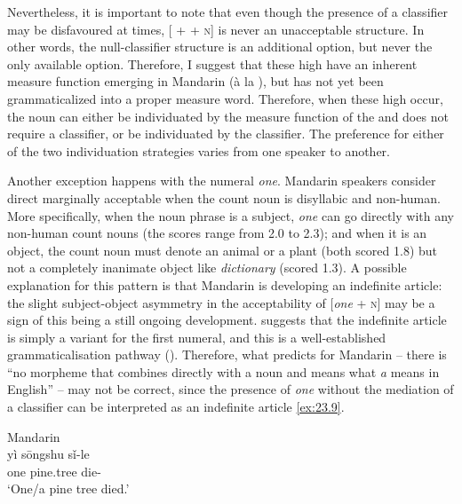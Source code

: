 \documentclass[output=paper]{langsci/langscibook}
\begin{document}
Nevertheless, it is important to note that even though the presence of a
classifier may be disfavoured at times, [\Num{} + \Clf{} + \textsc{n}] is never
an unacceptable structure. In other words, the null-classifier structure is an
additional option, but never the only available option. Therefore, I suggest
that these high  have an inherent measure function emerging in
Mandarin (à la \citealt{Krifka1995}), but has not yet been
grammaticalized into a proper measure word. Therefore,
when these high  occur, the noun can either be individuated by
the measure function of the  and does not require a
classifier, or be individuated by the
classifier. The preference for either of the two individuation
strategies varies from one speaker to another.

Another exception happens with the numeral \emph{one}. Mandarin speakers
consider direct  marginally acceptable when the count noun is
disyllabic and non-human. More specifically, when the noun phrase is a subject,
\emph{one} can go directly with any non-human count nouns (the scores range
from 2.0 to 2.3); and when it is an object, the count noun must denote an
animal or a plant (both scored 1.8) but not a completely inanimate object like
\emph{dictionary} (scored 1.3). A possible explanation for this pattern is
that Mandarin is developing an indefinite article: the slight subject-object
asymmetry in the acceptability of [\emph{one} + \textsc{n}] may be a sign of this being
a still ongoing development. \citet{Chierchia1998} suggests that the indefinite
article is simply a variant for the first numeral, and this is a
well-established grammaticalisation pathway (\citealt{HeineKuteva2002}).
Therefore, what \citeauthor{Chierchia1998} predicts for Mandarin -- there is
“no morpheme that combines directly with a noun and means what \emph{a} means
in English” \parencite[91]{Chierchia1998} -- may not be correct, since the
presence of \emph{one} without the mediation of a classifier
can be interpreted as an indefinite article \eqref{ex:23.9}.

\ea\label{ex:23.9} Mandarin\\
    \gll yì sōngshu sǐ-le\\
    	one pine.tree die-\Pfv{}\\
    \glt `One/a pine tree died.'
\z
\end{document}
